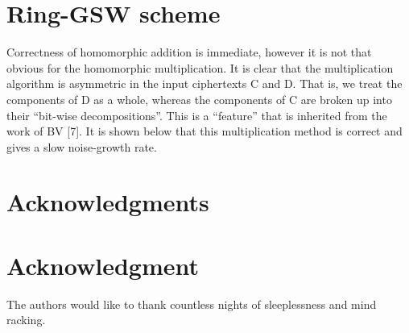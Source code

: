 \documentclass[10pt,journal,compsoc]{IEEEtran}
\theoremstyle{definition}
\begin{document}
\section{Ring-GSW scheme}

Correctness of homomorphic addition is immediate,
however it is not that obvious for the homomorphic
multiplication. It is clear that the multiplication algorithm
is asymmetric in the input ciphertexts C and D. That
is, we treat the components of D as a whole, whereas
the components of C are broken up into their “bit-wise
decompositions”. This is a “feature” that is inherited from
the work of BV [7]. It is shown below that this multiplication
method is correct and gives a slow noise-growth rate.

\appendices



\ifCLASSOPTIONcompsoc
  \section*{Acknowledgments}
\else
  \section*{Acknowledgment}
\fi


The authors would like to thank countless nights of sleeplessness and mind racking.


\ifCLASSOPTIONcaptionsoff
  \newpage
\fi





%
%
%
\end{document}
